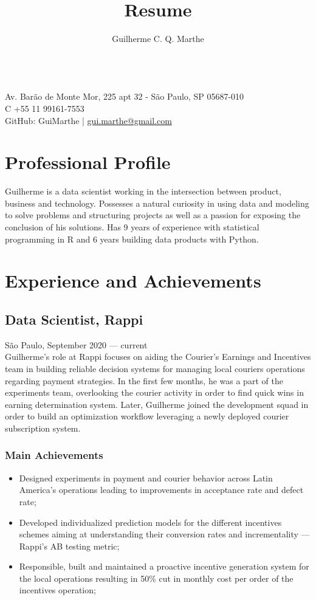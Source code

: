 \documentclass{article}
\author{Guilherme C. Q. Marthe}
\title{Resume}
\makeatletter
\renewcommand{\maketitle}{
\begin{flushleft}
	{\huge\theauthor}
	\vspace{0.2em}\\
	Av. Barão de Monte Mor, 225 apt 32 - São Paulo, SP 05687-010\\
	C +55 11 99161-7553\\
	GitHub: GuiMarthe | \href{mailto:gui.marthe@gmail.com}{gui.marthe@gmail.com}
\end{flushleft}
}
\newcommand{\jobdate}[3]{
\large
\vspace{0.05em} 
  {#1, #2 --- #3}
\vspace{0.5em} 
\\
}
\makeatother
\begin{document}
\maketitle

\section{Professional Profile}

 \linespread{.99}\large{
Guilherme is a data scientist working in the intersection between product, business and technology. Possesses a natural curiosity in using data and modeling to solve problems and structuring projects as well as a passion for exposing the conclusion of his solutions. Has 9 years of experience with statistical programming in R and 6 years building data products with Python.
 }


\section{Experience and Achievements}

\subsection{Data Scientist, Rappi}
\jobdate{São Paulo}{September 2020}{current}
Guilherme's role at Rappi focuses on aiding the Courier's Earnings and Incentives team in building reliable decision systems for managing local couriers operations regarding payment strategies. In the first few months, he was a part of the experiments team, overlooking the courier activity in order to find quick wins in earning determination system. Later, Guilherme joined the development squad in order to build an optimization workflow leveraging a newly deployed courier subscription system.
\subsubsection{Main Achievements}

\begin{itemize}

\item{Designed experiments in payment and courier behavior across Latin America's operations leading to improvements in acceptance rate and defect rate;}
\item{Developed individualized prediction models for the different incentives schemes aiming at understanding their conversion rates and incrementality --- Rappi's AB testing metric;}
\item{Responsible, built and maintained a proactive incentive generation system for the local operations resulting in 50\% cut in monthly cost per order of the incentives operation;}
\end{itemize}
\end{document}
